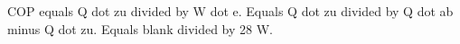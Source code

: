 COP equals Q dot zu divided by W dot e.  
Equals Q dot zu divided by Q dot ab minus Q dot zu.  
Equals blank divided by 28 W.